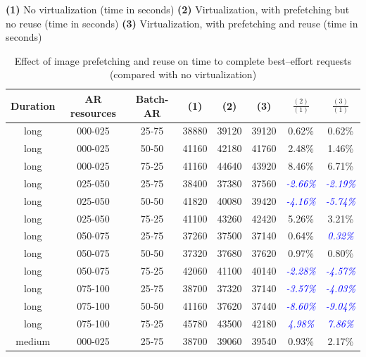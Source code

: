 \begin{table}

\begin{center}
\caption{Effect of image prefetching and reuse on time to complete best--effort requests (compared with no virtualization)}
\textbf{(1)} No virtualization (time in seconds)
\textbf{(2)} Virtualization, with prefetching but no reuse (time in seconds)
\textbf{(3)} Virtualization, with prefetching and reuse (time in seconds)

\begin{tabular}{|c|c|c|c|c|c|c|c|}
\hline
\textbf{Duration} & \textbf{AR resources} & \textbf{Batch-AR} & \textbf{(1)} & \textbf{(2)} & \textbf{(3)} &  \textbf{$\frac{(2)}{(1)}$} & \textbf{$\frac{(3)}{(1)}$}
\\\hline
long & 000-025 & 25-75 & 38880 & 39120 & 39120 & 0.62\% & 0.62\%
\\\hline
long & 000-025 & 50-50 & 41160 & 42180 & 41760 & 2.48\% & 1.46\%
\\\hline
long & 000-025 & 75-25 & 41160 & 44640 & 43920 & 8.46\% & 6.71\%
\\\hline
long & 025-050 & 25-75 & 38400 & 37380 & 37560 & \textcolor{blue}{\textit{-2.66\%}} & \textcolor{blue}{\textit{-2.19\%}}
\\\hline
long & 025-050 & 50-50 & 41820 & 40080 & 39420 & \textcolor{blue}{\textit{-4.16\%}} & \textcolor{blue}{\textit{-5.74\%}}
\\\hline
long & 025-050 & 75-25 & 41100 & 43260 & 42420 & 5.26\% & 3.21\%
\\\hline
long & 050-075 & 25-75 & 37260 & 37500 & 37140 & 0.64\% & \textcolor{blue}{\textit{0.32\%}}
\\\hline
long & 050-075 & 50-50 & 37320 & 37680 & 37620 & 0.97\% & 0.80\%
\\\hline
long & 050-075 & 75-25 & 42060 & 41100 & 40140 & \textcolor{blue}{\textit{-2.28\%}} & \textcolor{blue}{\textit{-4.57\%}}
\\\hline
long & 075-100 & 25-75 & 38700 & 37320 & 37140 & \textcolor{blue}{\textit{-3.57\%}} & \textcolor{blue}{\textit{-4.03\%}}
\\\hline
long & 075-100 & 50-50 & 41160 & 37620 & 37440 & \textcolor{blue}{\textit{-8.60\%}} & \textcolor{blue}{\textit{-9.04\%}}
\\\hline
long & 075-100 & 75-25 & 45780 & 43500 & 42180 & \textcolor{blue}{\textit{4.98\%}} & \textcolor{blue}{\textit{7.86\%}}
\\\hline
medium & 000-025 & 25-75 & 38700 & 39060 & 39540 & 0.93\% & 2.17\%

\end{tabular}
\end{center}
\end{table}
